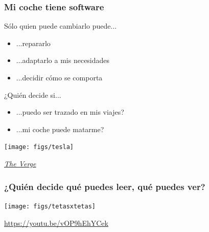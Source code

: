 \documentclass[17pt,aspectratio=169,hyperref=pdfusetitle]{beamer}
\begin{document}

\begin{frame}
\frametitle{Mi coche tiene software}

Sólo quien puede cambiarlo puede...

\begin{itemize}
\item ...repararlo
\item ...adaptarlo a mis necesidades
\item ...decidir cómo se comporta
\end{itemize}

¿Quién decide si...

\begin{itemize}
\item ...puedo ser trazado en mis viajes?
\item ...mi coche puede matarme?
\end{itemize}

\end{frame}

\begin{frame}[fragile]

  \begin{center}
  \texttt{[image: figs/tesla]}
  \end{center}

  \begin{flushright}
    {\em
      \href{https://www.theverge.com/2017/9/10/16283330/tesla-hurricane-irma-update-florida-extend-range-model-s-x-60-60d}{The Verge} \\
      }
  \end{flushright}
  
\end{frame}



\begin{frame}
\frametitle{¿Quién decide qué puedes leer, qué puedes ver?}

\begin{center}
\texttt{[image: figs/tetasxtetas]}
\end{center}

  \begin{flushright}
    {\small \url{https://youtu.be/vOP9hEhYCek}}
  \end{flushright}
\end{frame}
\end{document}
